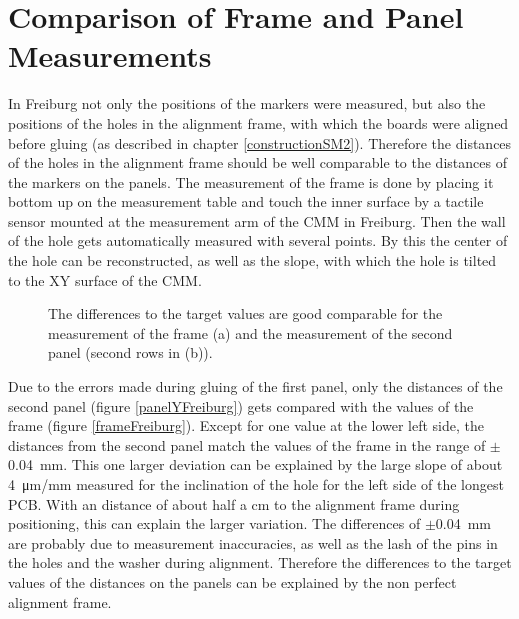\documentclass[
a4paper,                                %
twoside,                                %
BCOR1.4cm,                      %
10pt,                           %
headings=normal,                %
headsepline,                    %
clearplainpage, %
final,                                  %
div=14,
parskip=full,
openright,
bibliography=toc
]{scrreprt}
\begin{document}
\section{Comparison of Frame and Panel Measurements}

In Freiburg not only the positions of the markers were measured, but also the positions of the holes in the alignment frame, with which the boards were aligned before gluing (as described in chapter \ref{constructionSM2}). Therefore the distances of the holes in the alignment frame should be well comparable to the distances of the markers on the panels. The measurement of the frame is done by placing it bottom up on the measurement table and touch the inner surface by a tactile sensor mounted at the measurement arm of the CMM in Freiburg. Then the wall of the hole gets automatically measured with several points. By this the center of the hole can be reconstructed, as well as the slope, with which the hole is tilted to the XY surface of the CMM. 

\begin{figure}[H]	
	\centering
	\qquad
	\caption{The differences to the target values are good comparable for the measurement of the frame (a) and the measurement of the second panel (second rows in (b)).}
	\label{framePanelFreiburg}
\end{figure}

Due to the errors made during gluing of the first panel, only the distances of the second panel (figure \ref{panelYFreiburg}) gets compared with the values of the frame (figure \ref{frameFreiburg}). Except for one value at the lower left side, the distances from the second panel match the values of the frame in the range of $\pm$\SI{0.04}{\mm}. This one larger deviation can be explained by the large slope of about \SI{4}{\micro\m/\mm} measured for the inclination of the hole for the left side of the longest PCB. With an distance of about half a cm to the alignment frame during positioning, this can explain the larger variation. The differences of $\pm$\SI{0.04}{\mm} are probably due to measurement inaccuracies, as well as the lash of the pins in the holes and the washer during alignment. Therefore the differences to the target values of the distances on the panels can be explained by the non perfect alignment frame.
\end{document}
